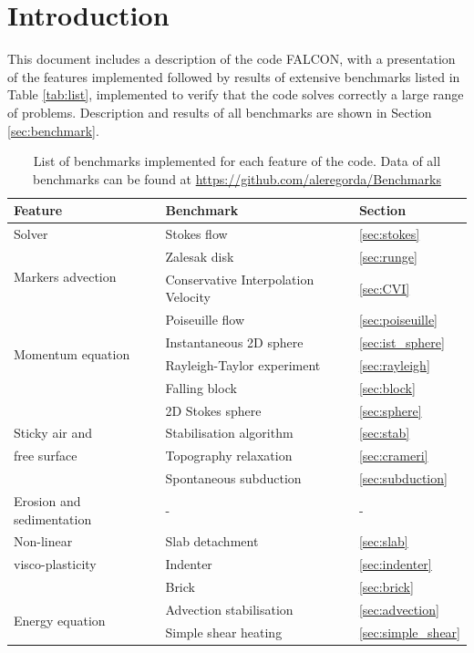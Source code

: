 \documentclass[hidelinks,10pt,a4paper]{article}
\begin{document}
\section{Introduction}\label{sec:intro}
This document includes a description of the code FALCON, with a presentation of the features implemented followed by results of extensive benchmarks listed in
Table \ref{tab:list}, implemented to verify that the code solves correctly a large range of problems. Description and results of all benchmarks are shown
in Section \ref{sec:benchmark}.

\begin{table}[H]
\caption{List of benchmarks implemented for each feature of the code. Data of all benchmarks can be found at 
\url{https://github.com/aleregorda/Benchmarks}}
\centering
\begin{tabular}{| l | l | l |}
\toprule
 \textbf{Feature}  & \textbf{Benchmark} & \textbf{Section} \\
\midrule
  Solver  & Stokes flow & \ref{sec:stokes} \\
\hline
  \multirow{2}{*}{Markers advection} & Zalesak disk & \ref{sec:runge} \\
    & Conservative Interpolation Velocity & \ref{sec:CVI} \\
\hline
  \multirow{4}{*}{Momentum equation}  & Poiseuille flow & \ref{sec:poiseuille}\\
    & Instantaneous 2D sphere & \ref{sec:ist_sphere} \\
    & Rayleigh-Taylor experiment & \ref{sec:rayleigh} \\
    & Falling block & \ref{sec:block} \\
\hline
    & 2D Stokes sphere & \ref{sec:sphere} \\
    Sticky air and  & Stabilisation algorithm & \ref{sec:stab} \\
    free surface & Topography relaxation & \ref{sec:crameri} \\
  & Spontaneous subduction & \ref{sec:subduction} \\
\hline
  Erosion and sedimentation  & - & - \\
\hline
   Non-linear  & Slab detachment & \ref{sec:slab} \\
   visco-plasticity & Indenter & \ref{sec:indenter} \\
    & Brick & \ref{sec:brick} \\
\hline
  \multirow{3}{*}{Energy equation}  & Advection stabilisation & \ref{sec:advection} \\
    & Simple shear heating & \ref{sec:simple_shear} \\

\end{tabular}
\end{table}
\end{document}
